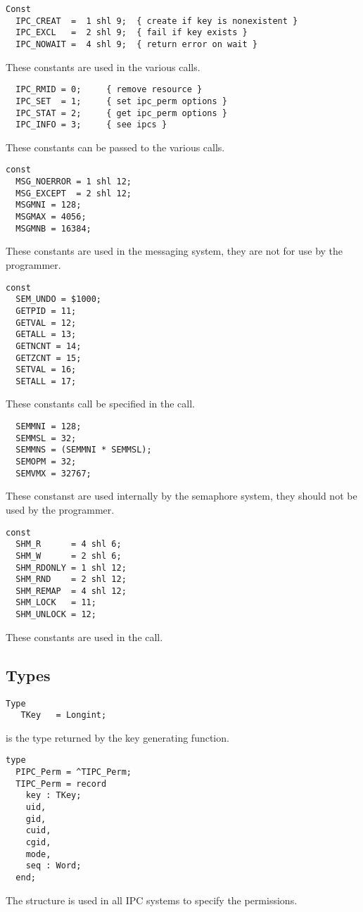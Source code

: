 \begin{verbatim}
Const 
  IPC_CREAT  =  1 shl 9;  { create if key is nonexistent }
  IPC_EXCL   =  2 shl 9;  { fail if key exists }
  IPC_NOWAIT =  4 shl 9;  { return error on wait }
\end{verbatim}
These constants are used in the various  calls.
\begin{verbatim}
  IPC_RMID = 0;     { remove resource }
  IPC_SET  = 1;     { set ipc_perm options }
  IPC_STAT = 2;     { get ipc_perm options }
  IPC_INFO = 3;     { see ipcs }
\end{verbatim}
These constants can be passed to the various  calls.
\begin{verbatim}
const
  MSG_NOERROR = 1 shl 12;
  MSG_EXCEPT  = 2 shl 12;
  MSGMNI = 128;
  MSGMAX = 4056;
  MSGMNB = 16384;
\end{verbatim}
These constants are used in the messaging system, they are not for use by
the programmer.
\begin{verbatim}
const
  SEM_UNDO = $1000;
  GETPID = 11;
  GETVAL = 12;
  GETALL = 13;
  GETNCNT = 14;
  GETZCNT = 15;
  SETVAL = 16;
  SETALL = 17;
\end{verbatim}
These constants call be specified in the  call.
\begin{verbatim}
  SEMMNI = 128;
  SEMMSL = 32;
  SEMMNS = (SEMMNI * SEMMSL);
  SEMOPM = 32;
  SEMVMX = 32767;
\end{verbatim}
These constanst are used internally by the semaphore system, they should not
be used by the programmer.
\begin{verbatim}
const
  SHM_R      = 4 shl 6;
  SHM_W      = 2 shl 6;
  SHM_RDONLY = 1 shl 12;
  SHM_RND    = 2 shl 12;
  SHM_REMAP  = 4 shl 12;
  SHM_LOCK   = 11;
  SHM_UNLOCK = 12;
\end{verbatim}
These constants are used in the  call.

\subsection{Types}

\begin{verbatim}
Type 
   TKey   = Longint;
\end{verbatim}
 is the type returned by the  key generating function.
\begin{verbatim}
type
  PIPC_Perm = ^TIPC_Perm;
  TIPC_Perm = record
    key : TKey;
    uid, 
    gid,
    cuid,
    cgid,
    mode,
    seq : Word;   
  end;
\end{verbatim}
The  structure is used in all IPC systems to specify the
permissions.

